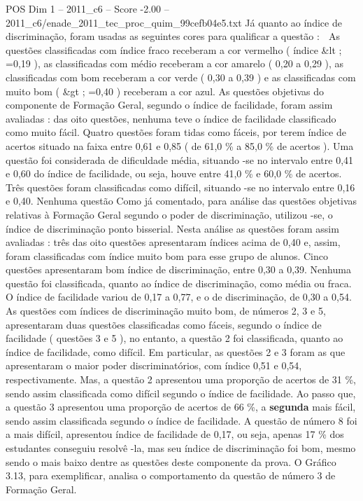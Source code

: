 \begin{textsample}{POS Dim 1 – 2011\_c6 – Score -2.00 – 2011\_c6/enade\_2011\_tec\_proc\_quim\_99cefb04e5.txt}
Já quanto ao índice de discriminação, foram usadas as seguintes cores para qualificar a questão :  As questões classificadas com índice fraco receberam a cor vermelho ( índice \&lt ; =0,19 ), as classificadas com médio receberam a cor amarelo ( 0,20 a 0,29 ), as classificadas com bom receberam a cor verde ( 0,30 a 0,39 ) e as classificadas com muito bom ( \&gt ; =0,40 ) receberam a cor azul.
As questões objetivas do componente de Formação Geral, segundo o índice de facilidade, foram assim avaliadas : das oito questões, nenhuma teve o índice de facilidade classificado como muito fácil.
Quatro questões foram tidas como fáceis, por terem índice de acertos situado na faixa entre 0,61 e 0,85 ( de 61,0 \% a 85,0 \% de acertos ).
Uma questão foi considerada de dificuldade média, situando -se no intervalo entre 0,41 e 0,60 do índice de facilidade, ou seja, houve entre 41,0 \% e 60,0 \% de acertos.
Três questões foram classificadas como difícil, situando -se no intervalo entre 0,16 e 0,40.
Nenhuma questão Como já comentado, para análise das questões objetivas relativas à Formação Geral segundo o poder de discriminação, utilizou -se, o índice de discriminação ponto bisserial.
Nesta análise as questões foram assim avaliadas : três das oito questões apresentaram índices acima de 0,40 e, assim, foram classificadas com índice muito bom para esse grupo de alunos.
Cinco questões apresentaram bom índice de discriminação, entre 0,30 a 0,39.
Nenhuma questão foi classificada, quanto ao índice de discriminação, como média ou fraca.
O índice de facilidade variou de 0,17 a 0,77, e o de discriminação, de 0,30 a 0,54.
As questões com índices de discriminação muito bom, de números 2, 3 e 5, apresentaram duas questões classificadas como fáceis, segundo o índice de facilidade ( questões 3 e 5 ), no entanto, a questão 2 foi classificada, quanto ao índice de facilidade, como difícil.
Em particular, as questões 2 e 3 foram as que apresentaram o maior poder discriminatórios, com índice 0,51 e 0,54, respectivamente.
Mas, a questão 2 apresentou uma proporção de acertos de 31 \%, sendo assim classificada como difícil segundo o índice de facilidade.
Ao passo que, a questão 3 apresentou uma proporção de acertos de 66 \%, a \textbf{segunda} mais fácil, sendo assim classificada segundo o índice de facilidade.
A questão de número 8 foi a mais difícil, apresentou índice de facilidade de 0,17, ou seja, apenas 17 \% dos estudantes conseguiu resolvê -la, mas seu índice de discriminação foi bom, mesmo sendo o mais baixo dentre as questões deste componente da prova.
O Gráfico 3.13, para exemplificar, analisa o comportamento da questão de número 3 de Formação Geral.

\end{textsample}
